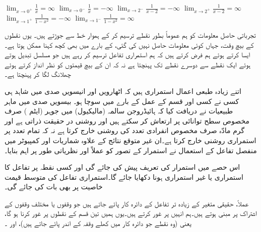 $\lim_{x\to 0^+}\tfrac{1}{x}=\infty$
$\lim_{x\to 0^-}\tfrac{1}{x}=-\infty$
$\lim_{x\to 2^-}\tfrac{1}{x-2}=-\infty$
$\lim_{x\to 2^+}\tfrac{1}{x-2}=\infty$
$\lim_{x\to 1^+}\tfrac{1}{1-x^2}=-\infty$
$\lim_{x\to 1^-}\tfrac{1}{1-x^2}=\infty$



تجرباتی حاصل معلومات  کو ہم عموماً بطور نقطے ترسیم کر کے  ہموار خط سے جوڑتے ہیں۔ یوں نقطوں کے بیچ وقت، جہاں کوئی معلومات حاصل نہیں کی گئی، کے بارے میں بھی کچھ کہنا ممکن ہوتا ہے۔ایسا کرتے ہوئے ہم فرض کرتے ہیں کہ ہم استمراری تفاعل  ترسیم کر رہے ہیں جو مسلسل تبدیل ہوتے ہوئے ایک نقطے سے دوسرے نقطے تک پہنچتا ہے نہ کہ ان کے بیچ قیمتوں کو نظر انداز کرتے ہوئے چھلانگ لگا کر پہنچتا ہے۔   

اتنے زیادہ طبعی اعمال  استمراری ہیں کہ اٹھارویں اور  انیسویں  صدی میں شاہد ہی کسی نے کسی اور قسم کے عمل کے بارے میں سوچا ہو۔ بیسویں صدی میں ماہر طبیعیات نے دریافت کیا کہ ہائیڈروجن  سالمہ (مالیکیول) میں  جوہر (ایٹم ) صرف مخصوص سطح توانائی پر ارتعاش کر سکتے ہیں اور روشنی در حقیقت ذراتی ہے اور گرم مادّہ صرف مخصوص انفرادی تعدد کی روشنی خارج کرتا ہے نہ کہ تمام تعدد پر استمراری  روشنی خارج کرتا ہے۔ان غیر متوقع نتائج کے علاوہ شماریات اور  کمپیوٹر میں منفصل  تفاعل کے استعمال نے استمرار کے تصور کو عملاً اور نظریاتی طور پر اہم بنایا۔

اس حصے میں استمرار کی تعریف پیش کی جائے گی اور کسی نقطہ پر تفاعل کا استمراری یا غیر استمراری ہونا دکھایا جائے گا۔استمراری تفاعل کی متوسط قیمت خاصیت پر بھی بات کی جائے گی۔

عملاً،  حقیقی متغیر کے زیادہ تر تفاعل کے دائرہ کار پائے جاتے ہیں جو وقفوں یا مختلف وقفوں کے اشتراک پر مبنی ہوتے ہیں۔ہم انہیں پر غور کرتے ہیں۔یوں ہمیں تین قسم کے نقطوں پر غور کرنا ہو گا، یعنی  (وہ نقطے جو دائرہ کار میں کھلے  وقفہ کے اندر پائے جاتے ہیں)،  اور  ۔

